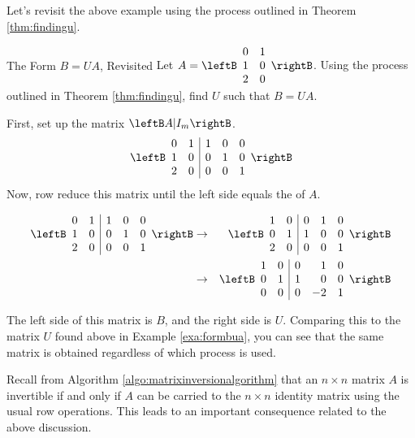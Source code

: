 Let's revisit the above example using the process outlined in Theorem \ref{thm:findingu}.

\begin{example}{The Form $B=UA$, Revisited}\label{exa:formbuarevisited}
Let $A = \leftB 
\begin{array}{rr} 
0 & 1 \\
1 & 0 \\
2 & 0 
\end{array}\rightB$. Using the process outlined in Theorem \ref{thm:findingu}, find $U$ such that $B=UA$. 
\end{example}

\begin{solution}
First, set up the matrix $\leftB A | I_m \rightB$. 
\[
\leftB \begin{array}{rr|rrr}
0 & 1 & 1 & 0 & 0 \\
1 & 0 & 0 & 1 & 0 \\
2 & 0 & 0 & 0 & 1 
\end{array}\rightB
\]
Now, row reduce this matrix until the left side equals the \rref\; of $A$. 

\begin{eqnarray*}
\leftB \begin{array}{rr|rrr}
0 & 1 & 1 & 0 & 0 \\
1 & 0 & 0 & 1 & 0 \\
2 & 0 & 0 & 0 & 1 
\end{array}\rightB 
&\rightarrow& 
\leftB \begin{array}{rr|rrr}
1 & 0 & 0 & 1 & 0 \\
0 & 1 & 1 & 0 & 0 \\
2 & 0 & 0 & 0 & 1 
\end{array}\rightB \\
&\rightarrow&
\leftB \begin{array}{rr|rrr}
1 & 0 & 0 & 1 & 0 \\
0 & 1 & 1 & 0 & 0 \\
0 & 0 & 0 & -2 & 1 
\end{array}\rightB
\end{eqnarray*}

The left side of this matrix is $B$, and the right side is $U$. Comparing this to the matrix $U$ found above in Example \ref{exa:formbua}, you can see that the same matrix is obtained regardless of which process is used. 
\end{solution}

Recall from Algorithm \ref{algo:matrixinversionalgorithm} that an $n \times n$  matrix $A$ is invertible if and only if $A$ can be carried to the $n \times n$ identity matrix using the usual row operations. This leads to an important consequence related to the above discussion. 

